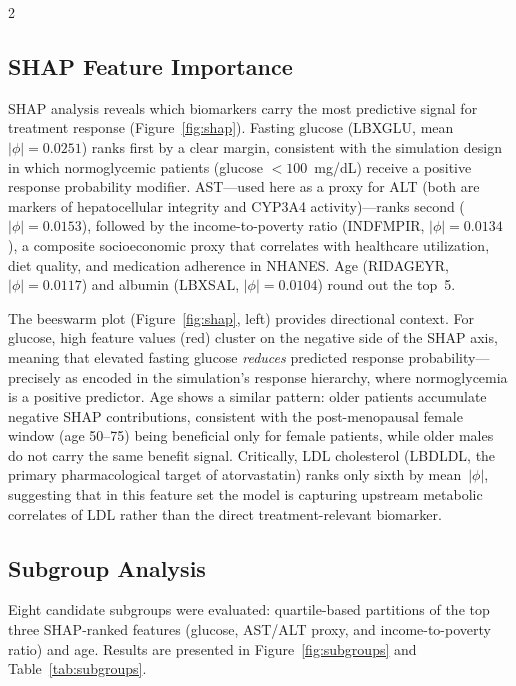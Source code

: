 \documentclass[12pt]{article}
\begin{document}
\begin{multicols}{2}

\subsection{SHAP Feature Importance}

SHAP analysis reveals which biomarkers carry the most predictive signal for
treatment response (Figure~\ref{fig:shap}).  Fasting glucose (LBXGLU,
mean~$|\phi|= 0.0251$) ranks first by a clear margin, consistent with
the simulation design in which normoglycemic patients (glucose $< 100$~mg/dL)
receive a positive response probability modifier.  AST---used here as a
proxy for ALT (both are markers of hepatocellular integrity and CYP3A4
activity)---ranks second ($|\phi| = 0.0153$), followed by the
income-to-poverty ratio (INDFMPIR, $|\phi| = 0.0134$), a composite
socioeconomic proxy that correlates with healthcare utilization, diet
quality, and medication adherence in NHANES.  Age (RIDAGEYR, $|\phi|
= 0.0117$) and albumin (LBXSAL, $|\phi| = 0.0104$) round out the top~5.

The beeswarm plot (Figure~\ref{fig:shap}, left) provides directional
context.  For glucose, high feature values (red) cluster on the negative
side of the SHAP axis, meaning that elevated fasting glucose \textit{reduces}
predicted response probability---precisely as encoded in the simulation's
response hierarchy, where normoglycemia is a positive predictor.  Age shows
a similar pattern: older patients accumulate negative SHAP contributions,
consistent with the post-menopausal female window (age 50--75) being
beneficial only for female patients, while older males do not carry the
same benefit signal.  Critically, LDL cholesterol (LBDLDL, the primary
pharmacological target of atorvastatin) ranks only sixth by mean~$|\phi|$,
suggesting that in this feature set the model is capturing upstream metabolic
correlates of LDL rather than the direct treatment-relevant biomarker.

\subsection{Subgroup Analysis}

Eight candidate subgroups were evaluated: quartile-based partitions of
the top three SHAP-ranked features (glucose, AST/ALT proxy, and
income-to-poverty ratio) and age.  Results are presented in
Figure~\ref{fig:subgroups} and Table~\ref{tab:subgroups}.

\end{multicols}
\end{document}
